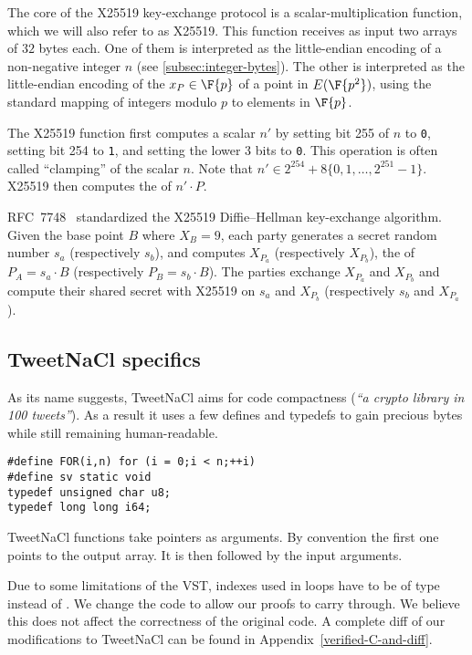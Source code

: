 The core of the X25519 key-exchange protocol is a scalar\hyp{}multiplication
function, which we will also refer to as X25519.
This function receives as input two arrays of $32$ bytes each.
One of them is interpreted as the little-endian encoding of a
non-negative integer $n$ (see \ref{subsec:integer-bytes}).
The other is interpreted as the little-endian encoding of
the \xcoord $x_P \in \F{p}$ of a point in $E(\F{p^2})$,
using the standard mapping of integers modulo $p$ to elements in $\F{p}$.

The X25519 function first computes a scalar $n'$ by setting bit 255 of $n$
to \texttt{0}, setting bit 254 to \texttt{1}, and setting the lower 3 bits to \texttt{0}.
This operation is often called ``clamping'' of the scalar $n$.
Note that $n' \in 2^{254} + 8\{0,1,\ldots,2^{251}-1\}$.
X25519 then computes the \xcoord of $n'\cdot P$.

RFC~7748~\cite{rfc7748} standardized the X25519 Diffie–Hellman key-exchange algorithm.
Given the base point $B$ where $X_B=9$, each party generates a secret random number
$s_a$ (respectively $s_b$), and computes $X_{P_a}$ (respectively $X_{P_b}$), the
\xcoord of $P_A = s_a \cdot B$ (respectively $P_B = s_b \cdot B$).
The parties exchange $X_{P_a}$ and $X_{P_b}$ and compute their shared secret with
X25519 on $s_a$ and $X_{P_b}$ (respectively $s_b$ and $X_{P_a}$).

\subsection{TweetNaCl specifics}
\label{subsec:Number-TweetNaCl}

As its name suggests, TweetNaCl aims for code compactness (\emph{``a crypto library in 100 tweets''}).
As a result it uses a few defines and typedefs to gain precious bytes while
still remaining human-readable.
\begin{lstlisting}[language=Ctweetnacl]
#define FOR(i,n) for (i = 0;i < n;++i)
#define sv static void
typedef unsigned char u8;
typedef long long i64;
\end{lstlisting}

TweetNaCl functions take pointers as arguments. By convention the first one
points to the output array. It is then followed by the input arguments.

Due to some limitations of the VST, indexes used in  loops have to be
of type  instead of . We change the code to allow our
proofs to carry through. We believe this does not affect the correctness of the
original code. A complete diff of our modifications to TweetNaCl can be found in
Appendix~\ref{verified-C-and-diff}.


